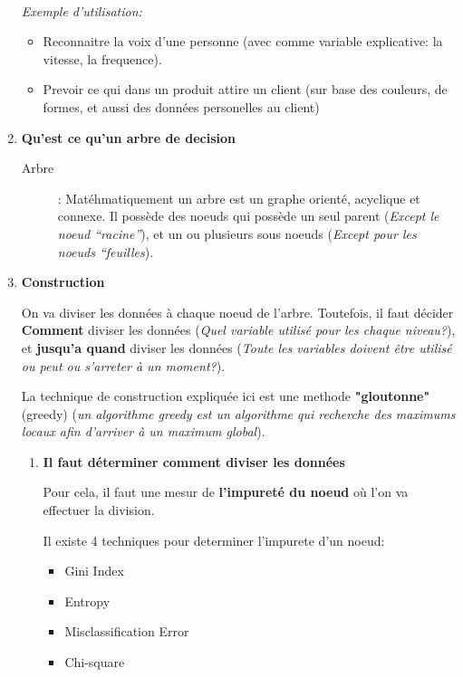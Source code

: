 \documentclass[a4paper, 11pt, onecolumn]{article}
\begin{document}
\begin{enumerate}
\paragraph{}\textit{Exemple d'utilisation:}
\begin{itemize}
\item Reconnaitre la voix d'une personne (avec comme variable
explicative: la vitesse, la frequence).

\item Prevoir ce qui dans un produit attire un client (sur base des couleurs,
de formes, et aussi des données personelles au client)
\end{itemize}

\item \textbf{Qu'est ce qu'un arbre de decision}

\begin{description}
  \item[Arbre] : Matéhmatiquement un arbre est un graphe orienté, acyclique et connexe. Il possède des noeuds qui possède un seul parent (\textit{Except le noeud ``racine''}),
    et un ou plusieurs sous noeuds (\textit{Except pour les noeuds ``feuilles}).
\end{description}

\item \textbf{Construction}

  On va diviser les données à chaque noeud de l'arbre. 
  Toutefois, il faut décider \textbf{Comment} diviser les données 
  (\textit{Quel variable utilisé pour les chaque niveau?}), et \textbf{jusqu'a quand} diviser
  les données (\textit{Toute les variables doivent être utilisé ou peut ou s'arreter
  à un moment?}).

  La technique de construction expliquée ici est une methode \textbf{"gloutonne"} 
  (greedy) (\textit{un algorithme greedy est un algorithme qui recherche des maximums locaux afin d'arriver à un maximum global}).

\begin{enumerate}
\item \textbf{Il faut déterminer comment diviser les données}

  Pour cela, il faut une mesur de \textbf{l'impureté du noeud} où l'on va effectuer
  la division.

Il existe 4 techniques pour determiner l'impurete d'un noeud:
\begin{itemize}
\item Gini Index
\item Entropy
\item Misclassification Error
\item Chi-square
\end{itemize}


\end{enumerate}
\end{enumerate}
\end{document}

